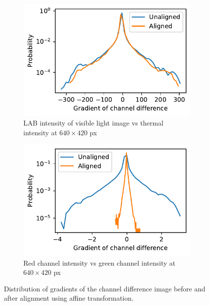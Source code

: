 \documentclass{l4proj}
\begin{document}
\begin{figure}[ht]
  \centering
  \begin{subfigure}[h!]{0.45\textwidth}
    \includegraphics[width=\textwidth]{images/registration/gradient_distribution}
    \caption{LAB intensity of visible light image vs thermal intensity at $640 \times 420$ px}
    \label{fig:gradient_distribution}
  \end{subfigure}
  \begin{subfigure}[h!]{0.45\textwidth}
    \includegraphics[width=\textwidth]{images/registration/gradient_distribution_red_green}
    \caption{Red channel intensity vs green channel intensity at $640 \times 420$ px}
    \label{fig:gradient_distribution_red_green}
  \end{subfigure}
  \caption{Distribution of gradients of the channel difference image before and after alignment using affine transformation.}
\end{figure}
\end{document}
